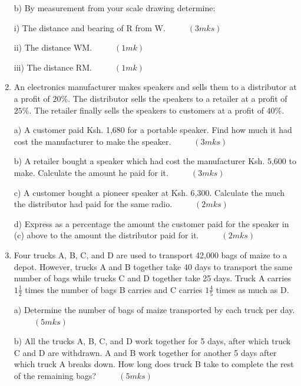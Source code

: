 \documentclass[
  a4paperpaper,
]{scrbook}
\begin{document}
\begin{tcolorbox}
\begin{enumerate}
  b) By measurement from your scale drawing determine:

  i) The distance and bearing of R from W. \(\hspace{1cm} (3mks)\)

  ii) The distance WM. \(\hspace{1cm} (1mk)\)

  iii) The distance RM. \(\hspace{1cm} (1mk)\)
\item
  An electronics manufacturer makes speakers and sells them to a
  distributor at a profit of \(20\%\). The distributor sells the
  speakers to a retailer at a profit of \(25\%\). The retailer finally
  sells the speakers to customers at a profit of \(40\%\).

  a) A customer paid Ksh. 1,680 for a portable speaker. Find how much it
  had cost the manufacturer to make the speaker. \(\hspace{1cm} (3mks)\)

  b) A retailer bought a speaker which had cost the manufacturer Ksh.
  5,600 to make. Calculate the amount he paid for it.
  \(\hspace{1cm} (3mks)\)

  c) A customer bought a pioneer speaker at Ksh. 6,300. Calculate the
  much the distributor had paid for the same radio.
  \(\hspace{1cm} (2mks)\)

  d) Express as a percentage the amount the customer paid for the
  speaker in (c) above to the amount the distributor paid for it.
  \(\hspace{1cm} (2mks)\)
\item
  Four trucks A, B, C, and D are used to transport 42,000 bags of maize
  to a depot. However, trucks A and B together take 40 days to transport
  the same number of bags while trucks C and D together take 25 days.
  Truck A carries \(1\frac{1}{2}\) times the number of bags B carries
  and C carries \(1\frac{4}{5}\) times as much as D.

  a) Determine the number of bags of maize transported by each truck per
  day.\(\hspace{1cm} (5mks)\)

  b) All the trucks A, B, C, and D work together for 5 days, after which
  truck C and D are withdrawn. A and B work together for another 5 days
  after which truck A breaks down. How long does truck B take to
  complete the rest of the remaining bags? \(\hspace{1cm}(5mks)\)
\end{enumerate}

\end{tcolorbox}
\end{document}
